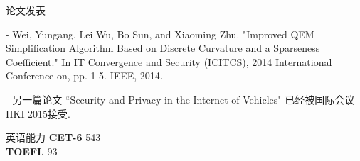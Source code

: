\documentclass[UTF8]{resume} %
\begin{document}
\begin{rSection}{论文发表}
\item[-] Wei, Yungang, Lei Wu, Bo Sun, and Xiaoming Zhu. "Improved QEM Simplification Algorithm Based on Discrete Curvature and a Sparseness Coefficient." In IT Convergence and Security (ICITCS), 2014 International Conference on, pp. 1-5. IEEE, 2014.
\item[-] 另一篇论文-``Security and Privacy in the Internet of Vehicles" 已经被国际会议 IIKI 2015接受.
\end{rSection}


\begin{rSection}{英语能力}
	{\bf CET-6}  { 543}\\
	{\bf TOEFL}  { 93}\\
\end{rSection}





\end{document}
